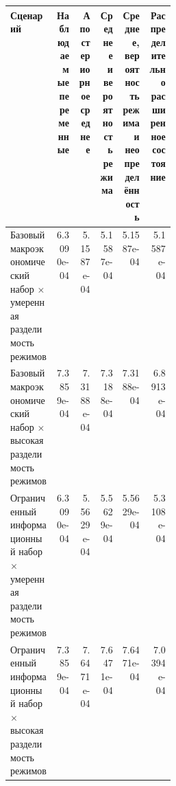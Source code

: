 \begin{tabular}{p{0.28\linewidth}rrrrr}
\toprule
Сценарий & Наблюдаемые переменные & Апостериорное среднее & Среднее и вероятность режима & Среднее, вероятность режима и неопределённость & Распределительно расширенное состояние \\
\midrule
Базовый макроэкономический набор × умеренная разделимость режимов & 6.3090e-04 & 5.1587e-04 & 5.1587e-04 & 5.1587e-04 & 5.1587e-04 \\
Базовый макроэкономический набор × высокая разделимость режимов & 7.3859e-04 & 7.3188e-04 & 7.3188e-04 & 7.3188e-04 & 6.8913e-04 \\
Ограниченный информационный набор × умеренная разделимость режимов & 6.3090e-04 & 5.5629e-04 & 5.5629e-04 & 5.5629e-04 & 5.3108e-04 \\
Ограниченный информационный набор × высокая разделимость режимов & 7.3859e-04 & 7.6471e-04 & 7.6471e-04 & 7.6471e-04 & 7.0394e-04 \\
\bottomrule
\end{tabular}